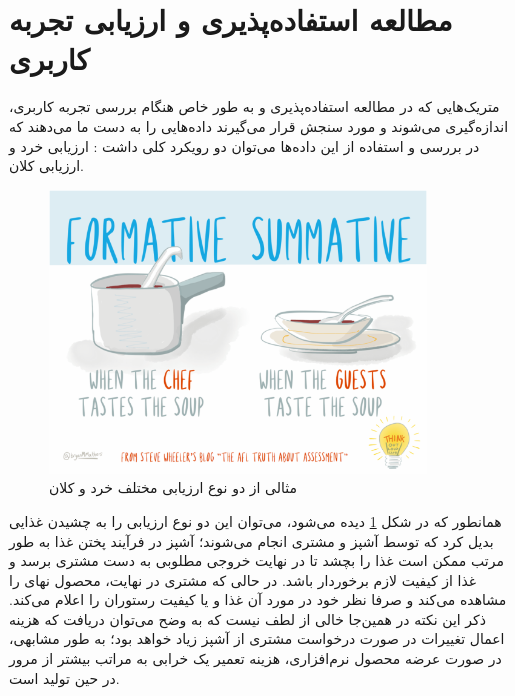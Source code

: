 \section{مطالعه استفاده‌پذیری و ارزیابی تجربه کاربری}
متریک‌هایی که در مطالعه استفاده‌پذیری و به طور خاص هنگام بررسی تجربه کاربری، اندازه‌گیری می‌شوند و مورد سنجش قرار می‌گیرند داده‌هایی را به دست ما می‌دهند که در بررسی و استفاده از این داده‌ها می‌توان دو رویکرد کلی داشت
\cite{albert_measuring_2013}:
ارزیابی خرد و ارزیابی کلان.\\
\begin{figure}
	\centering\includegraphics[width=10cm]{Resources/assessment.PNG}
	\caption{مثالی از دو نوع ارزیابی مختلف خرد و کلان
		\cite{noauthor_formative_nodate}
	}
	\label{fig:assessment}
\end{figure}
همانطور که در شکل
\ref{fig:assessment}
دیده می‌شود، می‌توان این دو نوع ارزیابی را به  چشیدن غذایی بدیل کرد که توسط آشپز و مشتری انجام می‌شوند؛ آشپز در فرآیند پختن غذا به طور مرتب ممکن است غذا را بچشد تا در نهایت خروجی مطلوبی به دست مشتری برسد و غذا از کیفیت لازم برخوردار باشد. در حالی که مشتری در نهایت، محصول نهای را مشاهده می‌کند و صرفا نظر خود در مورد آن غذا و یا کیفیت رستوران را اعلام می‌کند. ذکر این نکته  در همین‌جا خالی از لطف نیست که به وضح می‌توان دریافت که هزینه اعمال تغییرات در صورت درخواست مشتری از آشپز زیاد خواهد بود؛ به طور مشابهی، در صورت عرضه محصول نرم‌افزاری، هزینه تعمیر یک خرابی به مراتب بیشتر از مرور در حین تولید است.
